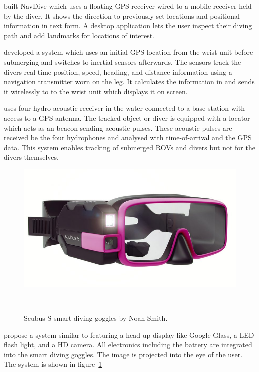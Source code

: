 \cite{navdive} built NavDive which uses a floating GPS receiver wired to a mobile receiver held by the diver. 
It shows the direction to previously set locations and positional information in text form. 
A desktop application lets the user inspect their diving path and add landmarks for locations of interest.

\cite{ariadna} developed a system which uses an initial GPS location from the wrist unit before submerging and switches to  inertial sensors afterwards.
The sensors track the divers real-time position, speed, heading, and distance information using a navigation transmitter worn on the leg.
It calculates the information in and sends it wirelessly to to the wrist unit which displays it on screen.

\cite{waterlinked} uses four hydro acoustic receiver in the water connected to a base station with access to a GPS antenna. 
The tracked object or diver is equipped with a locator which acts as an beacon sending acoustic pulses. 
These acoustic pulses are received be the four hydrophones and analysed with time-of-arrival and the GPS data. This system enables tracking of submerged ROVs and divers but not for the divers themselves.

\begin{figure}
	\centering
	\includegraphics[width=\columnwidth]{images/scubusS.jpg}
	\caption{Scubus S smart diving goggles by Noah Smith.}~\label{fig:scubusS}
	\vspace{-2em}
\end{figure}

\cite{scubus} propose a system similar to featuring a head up display like Google Glass, a LED flash light, and a HD camera. 
All electronics including the battery are integrated into the smart diving goggles.
The image is projected into the eye of the user. 
The system is shown in figure~\ref{fig:scubusS} 

